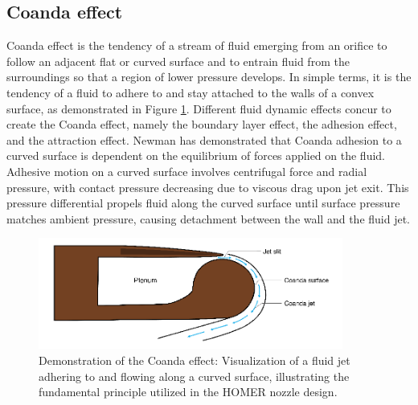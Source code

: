 \subsection{Coanda effect}
Coanda effect is the tendency of a stream of fluid emerging from an orifice to follow an adjacent flat or curved surface and to entrain fluid from the surroundings so that a region of lower pressure develops. In simple terms, it is the tendency of a fluid to adhere to and stay attached to the walls of a convex surface, as demonstrated in Figure \ref{fig:Coanda}. Different fluid dynamic effects concur to create the Coanda effect, namely the boundary layer effect, the adhesion effect, and the attraction effect. Newman \cite{newman} has demonstrated that Coanda adhesion to a curved surface is dependent on the equilibrium of forces applied on the fluid. Adhesive motion on a curved surface involves centrifugal force and radial pressure, with contact pressure decreasing due to viscous drag upon jet exit. This pressure differential propels fluid along the curved surface until surface pressure matches ambient pressure, causing detachment between the wall and the fluid jet. 
\begin{figure}[ht]
    \centering
    \includegraphics[width=10cm]{images/Theory-CFD/Coanda-effect.png}
    \caption{Demonstration of the Coanda effect: Visualization of a fluid jet adhering to and flowing along a curved surface, illustrating the fundamental principle utilized in the HOMER nozzle design.}
    \label{fig:Coanda}
  \end{figure}
